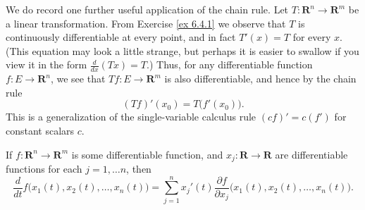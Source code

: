 \begin{note}
    We do record one further useful application of the chain rule.
    Let \(T : \mathbf{R}^n \to \mathbf{R}^m\) be a linear transformation.
    From Exercise \ref{ex 6.4.1} we observe that \(T\) is continuously differentiable at every point, and in fact \(T'(x) = T\) for every \(x\).
    (This equation may look a little strange, but perhaps it is easier to swallow if you view it in the form \(\frac{d}{dx} (Tx) = T\).)
    Thus, for any differentiable function \(f : E \to \mathbf{R}^n\), we see that \(T f : E \to \mathbf{R}^m\) is also differentiable, and hence by the chain rule
    \[
        (T f)'(x_0) = T\big(f'(x_0)\big).
    \]
    This is a generalization of the single-variable calculus rule \((cf)' = c(f')\) for constant scalars \(c\).
\end{note}

\begin{additional corollary}\label{ac 6.4.1}
If \(f : \mathbf{R}^n \to \mathbf{R}^m\) is some differentiable function, and \(x_j : \mathbf{R} \to \mathbf{R}\) are differentiable functions for each \(j = 1, \dots n\), then
\[
    \frac{d}{dt} f\big(x_1(t), x_2(t), \dots, x_n(t)\big) = \sum_{j = 1}^n x_j'(t) \frac{\partial f}{\partial x_j} \big(x_1(t), x_2(t), \dots, x_n(t)\big).
\]
\end{additional corollary}

